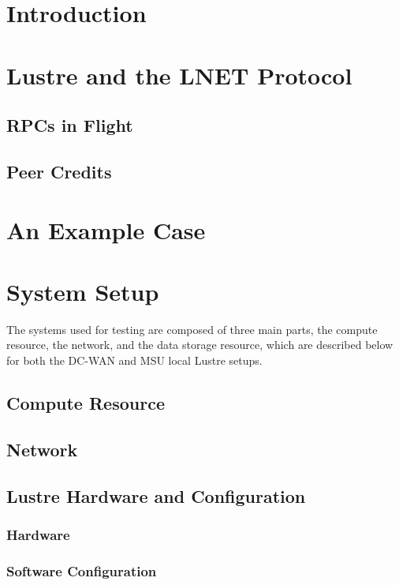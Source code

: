 \documentclass[]{sig-alternate}
\begin{document}
\section{Introduction}\label{sec:intro}


\section{Lustre and the LNET Protocol}\label{sec:LNET}

\subsection{RPCs in Flight}

\subsection{Peer Credits}
 

\section {An Example Case}\label{sec:usecase}


\section{System Setup}\label{sec:setup}
The systems used for testing are composed of three main parts, the compute resource, the network, and the data storage resource, which are described below for both the DC-WAN and MSU local Lustre setups.

\subsection{Compute Resource}



\subsection{Network}


\subsection{Lustre Hardware and Configuration}
\subsubsection{Hardware}\label{sec:hardware}


\subsubsection{Software Configuration}
\end{document}
